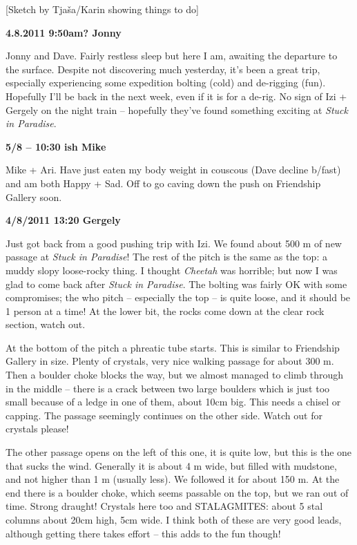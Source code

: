 {[}Sketch by Tjaša/Karin showing things to do{]}

\textbf{4.8.2011 9:50am? Jonny}

Jonny and Dave. Fairly restless sleep but here I am, awaiting the
departure to the surface. Despite not discovering much yesterday, it's
been a great trip, especially experiencing some expedition bolting
(cold) and de-rigging (fun). Hopefully I'll be back in the next week,
even if it is for a de-rig. No sign of Izi + Gergely on the night train
-- hopefully they've found something exciting at \emph{Stuck in
Paradise}.

\textbf{5/8 -- 10:30 ish Mike}

Mike + Ari. Have just eaten my body weight in couscous (Dave decline
b/fast) and am both Happy + Sad. Off to go caving down the push on
Friendship Gallery soon.

\textbf{4/8/2011 13:20 Gergely}

Just got back from a good pushing trip with Izi. We found about 500 m of
new passage at \emph{Stuck in Paradise}! The rest of the pitch is the
same as the top: a muddy slopy loose-rocky thing. I thought
\emph{Cheetah} was horrible; but now I was glad to come back after
\emph{Stuck in Paradise}. The bolting was fairly OK with some
compromises; the who pitch -- especially the top -- is quite loose, and
it should be 1 person at a time! At the lower bit, the rocks come down
at the clear rock section, watch out.

At the bottom of the pitch a phreatic tube starts. This is similar to
Friendship Gallery in size. Plenty of crystals, very nice walking
passage for about 300 m. Then a boulder choke blocks the way, but we
almost managed to climb through in the middle -- there is a crack
between two large boulders which is just too small because of a ledge in
one of them, about 10cm big. This needs a chisel or capping. The passage
seemingly continues on the other side. Watch out for crystals please!

The other passage opens on the left of this one, it is quite low, but
this is the one that sucks the wind. Generally it is about 4 m wide, but
filled with mudstone, and not higher than 1 m (usually less). We
followed it for about 150 m. At the end there is a boulder choke, which
seems passable on the top, but we ran out of time. Strong draught!
Crystals here too and STALAGMITES: about 5 stal columns about 20cm high,
5cm wide. I think both of these are very good leads, although getting
there takes effort -- this adds to the fun though!

